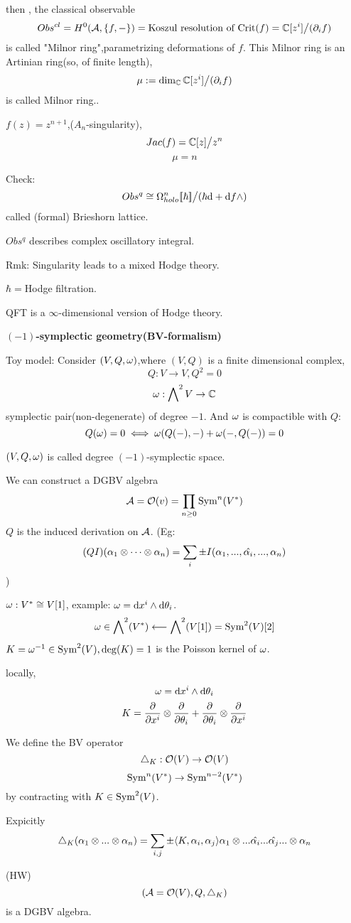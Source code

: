then , the classical observable
$$Obs^{cl}=H^0(\mathcal{A},\{f,-\})=
\text{Koszul resolution of $\operatorname{Crit}(f)$}
=\mathbb{C}[z^i]\big/(\partial_if)$$
is called "Milnor ring",parametrizing deformations of $f$.
This Milnor ring is an Artinian ring(so, of finite length),
$$\mu:=\dim_{\mathbb{C}}\mathbb{C}[z^i]\big/(\partial_if)$$
is called Milnor ring..

\begin{example}
$f(z)=z^{n+1}$,($A_n$-singularity),
$$Jac(f)=\mathbb{C}[z]\big/z^n$$
$$\mu=n$$
\end{example}

Check:
$$Obs^q\cong\Omega_{holo}^n[\![\hbar]\!]\big/
(\hbar\mathrm{d}+\mathrm{d} f\wedge)$$
called (formal) Brieshorn lattice.

$Obs^q$ describes complex oscillatory integral.

Rmk: Singularity leads to a mixed Hodge theory.

$\hbar=$Hodge filtration.

QFT is a $\infty$-dimensional version of Hodge theory.

\textbf{$(-1)$-symplectic geometry(BV-formalism)}

Toy model:
Consider $(V,Q,\omega)$,where $(V,Q)$ is a finite dimensional complex,
$$Q:V\to V,Q^2=0$$
$$\omega:\bigwedge\nolimits^{2}V\to\mathbb{C}$$
symplectic pair(non-degenerate) of degree $-1$.
And $\omega$ is compactible with $Q$:
$$Q(\omega)=0\iff
\omega(Q(-),-)+\omega(-,Q(-))=0$$

$(V,Q,\omega)$ is called degree $(-1)$-symplectic space.

We can construct a DGBV algebra
$$\mathcal{A}=\mathcal{O}(v)=\prod_{n\geq 0}\operatorname{Sym}^n(V^*)$$
$Q$ is the induced derivation on $\mathcal{A}$.
(Eg:
$$(QI)(\alpha_1\otimes\cdots\otimes\alpha_n)=
\sum_i\pm I(\alpha_1,...,\hat{\alpha_i},...,\alpha_n)$$
)

$\omega:V^*\cong V[1]$, example:
$\omega=\mathrm{d} x^i\wedge\mathrm{d}\theta_i$.
$$\omega\in\bigwedge\nolimits^{2}(V^*)\longleftarrow \bigwedge\nolimits^{2}(V[1])=\operatorname{Sym}^2(V)[2]$$
$K=\omega^{-1}\in\operatorname{Sym}^2(V),\deg(K)=1$ is the Poisson kernel of $\omega$.

locally,
$$\omega=\mathrm{d} x^i\wedge\mathrm{d}\theta_i$$
$$K=\frac{\partial } {\partial x^i}\otimes\frac{\partial } {\partial \theta_i}+\frac{\partial } {\partial \theta_i}\otimes\frac{\partial } {\partial x^i}$$

We define the BV operator
$$\triangle_K:\mathcal{O}(V)\to\mathcal{O}(V)$$
$$\operatorname{Sym}^n(V^*)\to\operatorname{Sym}^{n-2}(V^*)$$
by contracting with $K\in\operatorname{Sym}^2(V)$.

Expicitly
$$\triangle_K(\alpha_1\otimes...\otimes\alpha_n)
=\sum_{i,j}\pm\langle K,\alpha_i,\alpha_j\rangle\alpha_1\otimes...\hat{\alpha_i}...\hat{\alpha_j}...\otimes\alpha_n$$

\begin{prop}(HW)
$$(\mathcal{A}=\mathcal{O}(V),Q,\triangle_K)$$
is a DGBV algebra.
\end{prop}

